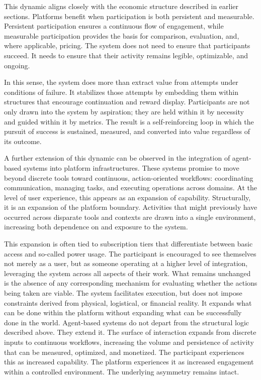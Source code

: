 \documentclass[12pt, a4paper]{article}
\begin{document}
This dynamic aligns closely with the economic structure described in earlier sections. Platforms benefit when participation is both persistent and measurable. Persistent participation ensures a continuous flow of engagement, while measurable participation provides the basis for comparison, evaluation, and, where applicable, pricing. The system does not need to ensure that participants succeed. It needs to ensure that their activity remains legible, optimizable, and ongoing.

In this sense, the system does more than extract value from attempts under conditions of failure. It stabilizes those attempts by embedding them within structures that encourage continuation and reward display. Participants are not only drawn into the system by aspiration; they are held within it by necessity and guided within it by metrics. The result is a self-reinforcing loop in which the pursuit of success is sustained, measured, and converted into value regardless of its outcome.

A further extension of this dynamic can be observed in the integration of agent-based systems into platform infrastructures. These systems promise to move beyond discrete tools toward continuous, action-oriented workflows: coordinating communication, managing tasks, and executing operations across domains. At the level of user experience, this appears as an expansion of capability. Structurally, it is an expansion of the platform boundary. Activities that might previously have occurred across disparate tools and contexts are drawn into a single environment, increasing both dependence on and exposure to the system.

This expansion is often tied to subscription tiers that differentiate between basic access and so-called power usage. The participant is encouraged to see themselves not merely as a user, but as someone operating at a higher level of integration, leveraging the system across all aspects of their work. What remains unchanged is the absence of any corresponding mechanism for evaluating whether the actions being taken are viable. The system facilitates execution, but does not impose constraints derived from physical, logistical, or financial reality. It expands what can be done within the platform without expanding what can be successfully done in the world. Agent-based systems do not depart from the structural logic described above. They extend it. The surface of interaction expands from discrete inputs to continuous workflows, increasing the volume and persistence of activity that can be measured, optimized, and monetized. The participant experiences this as increased capability. The platform experiences it as increased engagement within a controlled environment. The underlying asymmetry remains intact.
\end{document}
